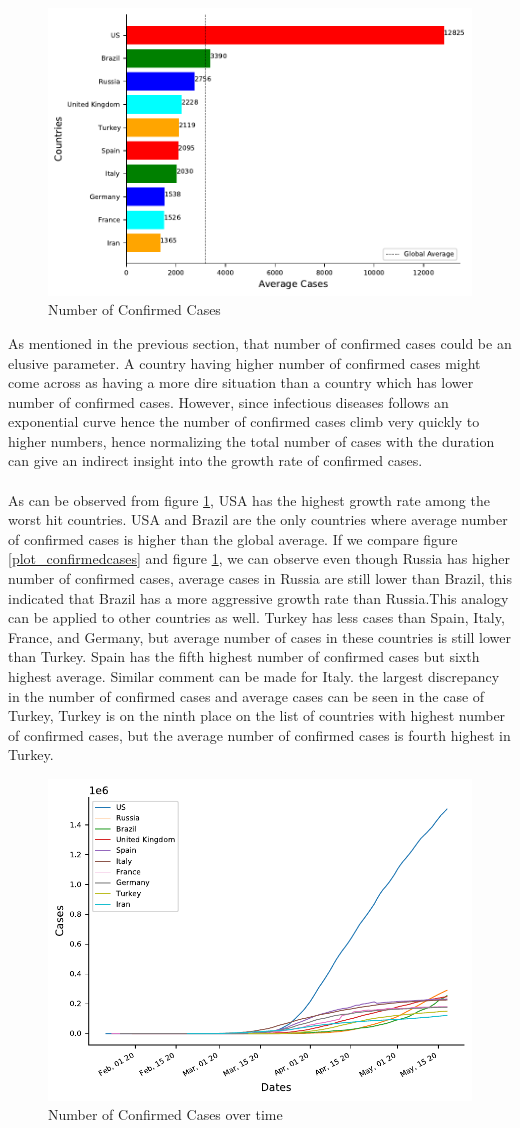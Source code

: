 \documentclass[12pt, twosided]{report}  %
\begin{document}
\begin{figure}[H]
	\centering
	\includegraphics[width=0.5\linewidth]{./images/plot-2.pdf}
	\caption{Number of Confirmed Cases}
	\label{plot_averagecases}
\end{figure}

As mentioned in the previous section, that number of confirmed cases could be an elusive parameter. A country having higher number of confirmed cases might come across as having a more dire situation than a country which has lower number of confirmed cases. However, since infectious diseases follows an exponential curve hence the number of confirmed cases climb very quickly to higher numbers, hence normalizing the total number of cases with the duration can give an indirect insight into the growth rate of confirmed cases.
\\
\\
As can be observed from figure \ref{plot_averagecases}, USA has the highest growth rate among the worst hit countries. USA and Brazil are the only countries where average number of confirmed cases is higher than the global average. If we compare figure \ref{plot_confirmedcases} and figure \ref{plot_averagecases}, we can observe even though Russia has higher number of confirmed cases, average cases in Russia are still lower than Brazil, this indicated that Brazil has a more aggressive growth rate than Russia.This analogy can be applied to other countries as well. Turkey has less cases than Spain, Italy, France, and Germany, but average number of cases in these countries is still lower than Turkey. Spain has the fifth highest number of confirmed cases but sixth highest average. Similar comment can be made for Italy. the largest discrepancy in the number of confirmed cases and average cases can be seen in the case of Turkey, Turkey is on the ninth place on the list of countries with highest number of confirmed cases, but the average number of confirmed cases is fourth highest in Turkey.

\begin{figure}[H]
	\centering
	\includegraphics[width=0.5\linewidth]{./images/plot-3.pdf}
	\caption{Number of Confirmed Cases over time}
	\label{plot_caseprogression}
\end{figure}
\end{document}
